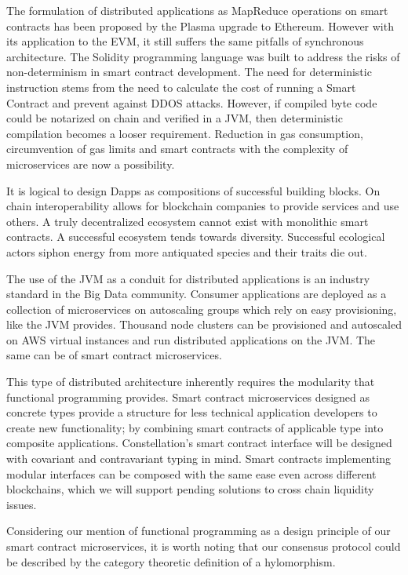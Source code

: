 \documentclass{article}
\begin{document}
The formulation of distributed applications as MapReduce operations on smart contracts has been proposed by the Plasma upgrade to Ethereum. However with its application to the EVM, it still suffers the same pitfalls of synchronous architecture. The Solidity programming language was built to address the risks of non-determinism in smart contract development. The need for deterministic instruction stems from the need to calculate the cost of running a Smart Contract and prevent against DDOS attacks. However, if compiled byte code could be notarized on chain and verified in a JVM, then deterministic compilation becomes a looser requirement. Reduction in gas consumption, circumvention of gas limits and smart contracts with the complexity of microservices are now a possibility.

It is logical to design Dapps as compositions of successful building blocks. On chain interoperability allows for blockchain companies to provide services and use others. A truly decentralized ecosystem cannot exist with monolithic smart contracts. A successful ecosystem tends towards diversity. Successful ecological actors siphon energy from more antiquated species and their traits die out. 

The use of the JVM as a conduit for distributed applications is an industry standard in the Big Data community. Consumer applications are deployed as a collection of microservices on autoscaling groups which rely on easy provisioning, like the JVM provides. Thousand node clusters can be provisioned and autoscaled on AWS virtual instances and run distributed applications on the JVM. The same can be of smart contract microservices. 

This type of distributed architecture inherently requires the modularity that functional programming provides. Smart contract microservices designed as concrete types provide a structure for less technical application developers to create new functionality; by combining smart contracts of applicable type into composite applications. Constellation's smart contract interface will be designed with covariant and contravariant typing in mind. Smart contracts implementing modular interfaces can be composed with the same ease even across different blockchains, which we will support pending solutions to cross chain liquidity issues.

Considering our mention of functional programming as a design principle of our smart contract microservices, it is worth noting that our consensus protocol could be described by the category theoretic definition of a hylomorphism.
\end{document}
